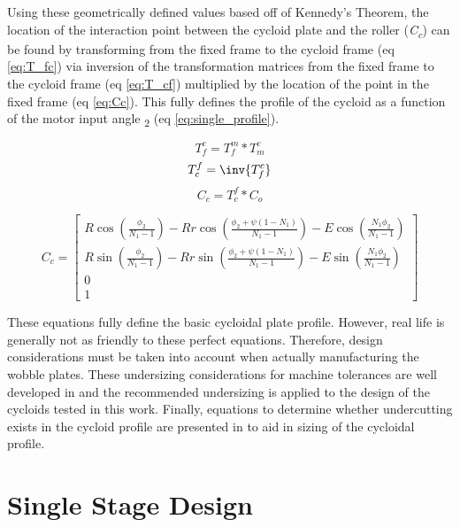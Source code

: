 Using these geometrically defined values based off of Kennedy's Theorem, the location of the interaction point between the cycloid plate and the roller (\textit{C\textsubscript{c}}) can be found by transforming from the fixed frame to the cycloid frame (eq \ref{eq:T_fc}) via inversion of the transformation matrices from the fixed frame to the cycloid frame (eq \ref{eq:T_cf}) multiplied by the location of the point in the fixed frame (eq \ref{eq:Cc}). This fully defines the profile of the cycloid as a function of the motor input angle \textphi\textsubscript{2} (eq \ref{eq:single_profile}).

\begin{equation} \label{eq:T_fc}
T_f^c = T_f^m * T_m^c 
\end{equation}
\begin{equation} \label{eq:T_cf}
T_c^f = \inv{T_f^c}
\end{equation}
\begin{equation} \label{eq:Cc}
C_c = T_c^f * C_o
\end{equation}

\begin{equation} \label{eq:single_profile}
C_c = \left[\begin{array}{c}
		R\cos(\frac{\phi_2}{N_1 -1}) - Rr\cos(\frac{\phi_2 + \psi(1-N_1)}{N_1-1}) - E\cos(\frac{N_1\phi_2}{N_1-1})\\
		R\sin(\frac{\phi_2}{N_1 -1}) - Rr\sin(\frac{\phi_2 + \psi(1-N_1)}{N_1-1}) - E\sin(\frac{N_1\phi_2}{N_1-1})\\
		0\\
		1
		\end{array} \right]
\end{equation}

These equations fully define the basic cycloidal plate profile. However, real life is generally not as friendly to these perfect equations. Therefore, design considerations must be taken into account when actually manufacturing the wobble plates. These undersizing considerations for machine tolerances are well developed in \cite{ref:design_and_application} and the recommended undersizing is applied to the design of the cycloids tested in this work. Finally, equations to determine whether undercutting exists in the cycloid profile are presented in \cite{ref:ye} to aid in sizing of the cycloidal profile. 



\section{Single Stage Design} \label{ch:design:single}

